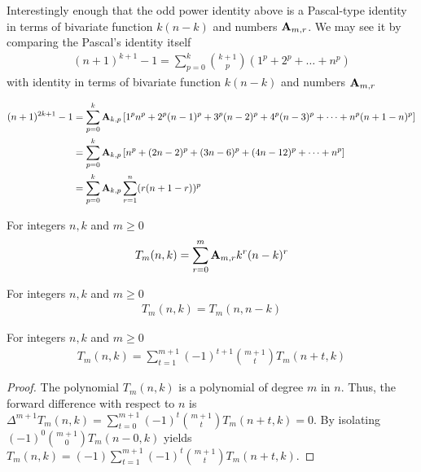 Interestingly enough that the odd power identity above is a Pascal-type identity
in terms of bivariate function $k(n-k)$ and numbers ${\mathbf{A}} \sb{m,r}$.
We may see it by comparing the Pascal's identity itself~\cite{macmillan2011proofs}
\begin{align*}
(n+1)
    ^{k+1}-1=\sum _{p=0}^{k}{\binom {k+1}{p}}(1^{p}+2^{p}+\dots +n^{p})
\end{align*}
with identity in terms of bivariate function $k(n-k)$ and numbers ${\mathbf{A}} \sb{m,r}$
\begin{corollary}
    \begin{align*}
    (n+1)
        ^{2k+1} - 1
        &= \sum_{p=0}^{k} {\mathbf{A}} \sb{k,p} \left[ 1^p n^p + 2^p (n-1)^p + 3^p (n-2)^p + 4^p (n-3)^p + \cdots +  n^p (n+1-n)^p  \right] \\
        &= \sum_{p=0}^{k} {\mathbf{A}} \sb{k,p} \left[ n^p + (2n-2)^p + (3n-6)^p + (4n-12)^p + \cdots +  n^p  \right] \\
        &= \sum_{p=0}^{k} {\mathbf{A}} \sb{k,p} \sum_{r=1}^{n} (r (n+1-r))^p
    \end{align*}
\end{corollary}
\begin{definition}
    For integers $n,k$ and $m \geq 0$
    \label{def:bivariate-sum-Tm}
    \begin{align*}
        T_{m}(n,k) = \sum_{r=0}^{m} {\mathbf{A}} \sb{m,r} k^r (n-k)^r
    \end{align*}
\end{definition}

\begin{proposition}[Symmetry of $T_m$]
    \label{prop:Tm-symmetry}
    For integers $n,k$ and $m\geq 0$
    \begin{align*}
        T_{m} (n, k) = T_{m} (n, n-k)
    \end{align*}
\end{proposition}
\begin{proposition}
    For integers $n,k$ and $m\geq 0$
    \label{prop:Tm-recurrence-forward}
    \begin{align*}
        T_{m} (n,k) = \sum_{t=1}^{m+1} (-1)^{t+1} \binom{m+1}{t} T_{m} (n+t, k)
    \end{align*}
    \begin{proof}
        The polynomial $T_{m} (n,k)$ is a polynomial of degree $m$ in $n$.
        Thus, the forward difference with respect to $n$ is
        $\Delta^{m+1} T_{m} (n, k) = \sum_{t=0}^{m+1} (-1)^{t} \binom{m+1}{t} T_{m} (n+t, k) = 0$.
        By isolating $(-1)^{0} \binom{m+1}{0} T_{m} (n-0, k)$ yields
        $T_{m} (n, k) = (-1) \sum_{t=1}^{m+1} (-1)^{t} \binom{m+1}{t} T_{m} (n+t, k)$.
    \end{proof}
\end{proposition}

